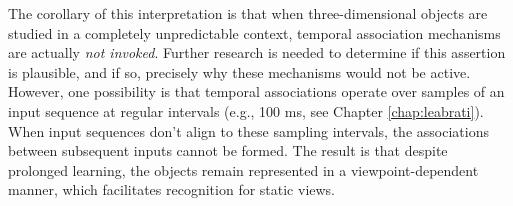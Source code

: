 \documentclass[dwyatte_dissertation.tex]{subfiles}
\begin{document}
The corollary of this interpretation is that when three-dimensional objects are studied in a completely unpredictable context, temporal association mechanisms are actually \textit{not invoked}. Further research is needed to determine if this assertion is plausible, and if so, precisely why these mechanisms would not be active. However, one possibility is that temporal associations operate over samples of an input sequence at regular intervals (e.g., 100 ms, see Chapter \ref{chap:leabrati}). When input sequences don't align to these sampling intervals, the associations between subsequent inputs cannot be formed. The result is that despite prolonged learning, the objects remain represented in a viewpoint-dependent manner, which facilitates recognition for static views.

%
%
\end{document}
